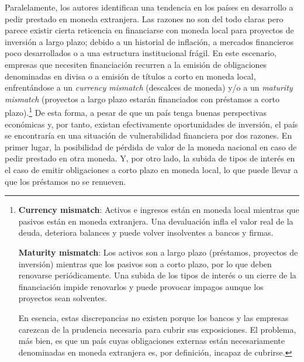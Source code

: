 \documentclass[10pt,a4paper]{article}
\begin{document}
Paralelamente, los autores identifican una tendencia en los países en desarrollo a pedir prestado en moneda extranjera. Las razones no son del todo claras pero parece existir cierta reticencia en financiarse con moneda local para proyectos de inversión a largo plazo; debido a un historial de inflación, a mercados financieros poco desarrollados o a una estructura institucional frágil. En este escenario, empresas que necesiten financiación recurren a la emisión de obligaciones denominadas en divisa o a emisión de títulos a corto en moneda local, enfrentándose a un \textit{currency mismatch} (descalces de moneda) y/o a un \textit{maturity mismatch} (proyectos a largo plazo estarán financiados con préstamos a corto plazo).\footnote{%
  \textbf{Currency mismatch}: Activos e ingresos están en moneda local mientras que pasivos están en moneda extranjera. Una devaluación infla el valor real de la deuda, deteriora balances y puede volver insolventes a bancos y firmas.

  \textbf{Maturity mismatch}: Los activos son a largo plazo (préstamos, proyectos de inversión) mientras que los pasivos son a corto plazo, por lo que deben renovarse periódicamente. Una subida de los tipos de interés o un cierre de la financiación impide renovarlos y puede provocar impagos aunque los proyectos sean solventes.

  En esencia, estas discrepancias no existen porque los bancos y las empresas carezcan de la prudencia necesaria para cubrir sus exposiciones. El problema, más bien, es que un país cuyas obligaciones externas están necesariamente denominadas en moneda extranjera es, por definición, incapaz de cubrirse.
} De esta forma, a pesar de que un país tenga buenas perspectivas económicas y, por tanto, existan efectivamente oportunidades de inversión, el país se encontraría en una situación de vulnerabilidad financiera por dos razones. En primer lugar, la posibilidad de pérdida de valor de la moneda nacional en caso de pedir prestado en otra moneda. Y, por otro lado, la subida de tipos de interés en el caso de emitir obligaciones a corto plazo en moneda local, lo que puede llevar a que los préstamos no se renueven.
\end{document}
